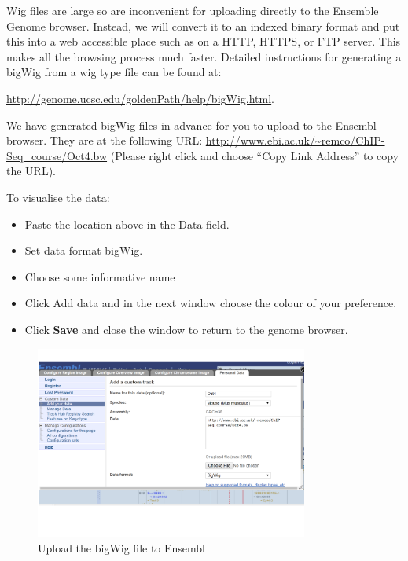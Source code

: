 \begin{note}
Wig files are large so are inconvenient for uploading directly to the Ensemble Genome browser. Instead, we will convert it to an indexed binary format
and put this into a web accessible place such as on a HTTP, HTTPS, or FTP server.
This makes all the browsing process much faster. Detailed
instructions for generating a bigWig from a wig type file can be found at:

\url{http://genome.ucsc.edu/goldenPath/help/bigWig.html}.

\end{note}

\begin{steps}
We have generated bigWig files in advance for you to upload to the Ensembl
browser. They are at the following URL:
\url{http://www.ebi.ac.uk/~remco/ChIP-Seq_course/Oct4.bw} (Please right click and choose ``Copy Link Address'' to copy the URL).

To visualise the data:
\begin{itemize}
	\item Paste the location above in the Data field. 
	\item Set data format bigWig. 
	\item Choose some informative name
        \item Click Add data and in the next window choose the colour of your preference. 
	\item Click \textbf{Save} and close the window to return to the genome browser. 
\end{itemize}

\begin{figure}[H]
\centering
\includegraphics[width=0.8\textwidth]{UploadURL.png}
\caption{Upload the bigWig file to Ensembl}
\label{fig:UploadURL}
\end{figure}


\end{steps}

